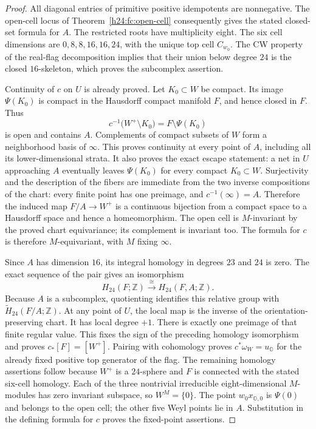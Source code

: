 \begin{proof}
All diagonal entries of primitive positive idempotents are
nonnegative. The open-cell locus of
Theorem~\ref{h24:fc:open-cell} consequently gives the stated
closed-set formula for $A$. The restricted roots have multiplicity
eight. The six cell dimensions are $0,8,8,16,16,24$, with the
unique top cell $C_{w_0}$. The CW property of the real-flag
decomposition implies that their union below degree $24$ is the
closed $16$-skeleton, which proves the subcomplex assertion.

Continuity of $c$ on $U$ is already proved. Let $K_0\subset W$
be compact. Its image $\Psi(K_0)$ is compact in the Hausdorff
compact manifold $F$, and hence closed in $F$. Thus
\[
 c^{-1}\bigl(W^+\setminus K_0\bigr)=F\setminus\Psi(K_0)
\]
is open and contains $A$. Complements of compact subsets of $W$
form a neighborhood basis of $\infty$. This proves continuity
at every point of $A$, including all its lower-dimensional strata.
It also proves the exact escape statement: a net in $U$ approaching
$A$ eventually leaves $\Psi(K_0)$ for every compact $K_0\subset W$.
Surjectivity and the description of the fibers are immediate from
the two inverse compositions of the chart: every finite point has
one preimage, and $c^{-1}(\infty)=A$. Therefore the induced map
$F/A\to W^+$ is a continuous bijection from a compact space to a
Hausdorff space and hence a homeomorphism.
The open cell is $M$-invariant by the proved chart equivariance;
its complement is invariant too. The formula for $c$ is therefore
$M$-equivariant, with $M$ fixing $\infty$.

Since $A$ has dimension $16$, its integral homology in degrees
$23$ and $24$ is zero. The exact sequence of the pair gives an
isomorphism
\[
 H_{24}(F;\mathbb Z)\xrightarrow{\ \cong\ }H_{24}(F,A;\mathbb Z).
\]
Because $A$ is a subcomplex, quotienting identifies this relative
group with $\widetilde H_{24}(F/A;\mathbb Z)$.
At any point of $U$, the local map is the inverse of the
orientation-preserving chart. It has local degree $+1$.
There is exactly one preimage of that finite regular value.
This fixes the sign of the preceding homology isomorphism and
proves $c_*[F]=[W^+]$. Pairing with cohomology proves
$c^*\omega_W=u_{\mathbb O}$ for the already fixed positive
top generator of the flag. The remaining homology assertions
follow because $W^+$ is a $24$-sphere and $F$ is connected with
the stated six-cell homology.
Each of the three nontrivial irreducible eight-dimensional
$M$-modules has zero invariant subspace, so $W^M=\{0\}$.
The point $w_0x_{\mathbb O,0}$ is $\Psi(0)$ and belongs to the
open cell; the other five Weyl points lie in $A$. Substitution
in the defining formula for $c$ proves the fixed-point assertions.
\end{proof}

